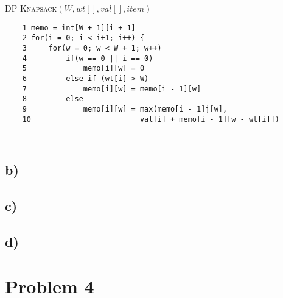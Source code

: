 \documentclass{article}
\begin{document}
\textsc{DP Knapsack$(W, wt[], val[], item)$}

\begin{verbatim}
    1 memo = int[W + 1][i + 1]
    2 for(i = 0; i < i+1; i++) {
    3     for(w = 0; w < W + 1; w++)
    4         if(w == 0 || i == 0)
    5             memo[i][w] = 0
    6         else if (wt[i] > W)
    7             memo[i][w] = memo[i - 1][w]
    8         else
    9             memo[i][w] = max(memo[i - 1]j[w],
    10                         val[i] + memo[i - 1][w - wt[i]])
\end{verbatim}

\begin{verbatim}
    
\end{verbatim}

\subsection*{b)}

\subsection*{c)}

\subsection*{d)}

\section*{Problem 4}
\end{document}
